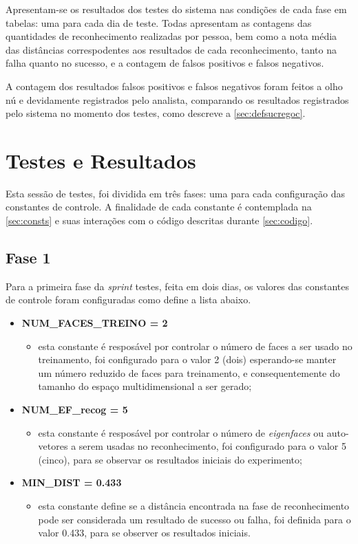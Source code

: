 Apresentam-se os resultados dos testes do sistema nas condições de cada fase em tabelas: uma para cada dia de teste. Todas apresentam as contagens das quantidades de reconhecimento realizadas por pessoa, bem como a nota média das distâncias correspodentes aos resultados de cada reconhecimento, tanto na falha quanto no sucesso, e a contagem de falsos positivos e falsos negativos.

A contagem dos resultados falsos positivos e falsos negativos foram feitos a olho nú e devidamente registrados pelo analista, comparando os resultados registrados pelo sistema no momento dos testes, como descreve a \autoref{sec:defsucregoc}.

\section{Testes e Resultados}\label{ch:testresult}

Esta sessão de testes, foi dividida em três fases: uma para cada configuração das constantes de controle. A finalidade de cada constante é contemplada na \autoref{sec:consts} e suas interações com o código descritas durante \autoref{sec:codigo}.


\subsection{Fase 1}\label{ch:testresultfaz1}
Para a primeira fase da \textit{sprint} testes, feita em dois dias, os valores das constantes de controle foram configuradas como define a lista abaixo.

\begin{itemize}	
	\item \textbf{NUM\_FACES\_TREINO = 2}
	\begin{itemize}	
		\item esta constante é resposável por controlar o número de faces a ser usado no treinamento, foi configurado para o valor 2 (dois) esperando-se manter um número reduzido de faces para treinamento, e consequentemente do tamanho do espaço multidimensional a ser gerado;
	\end{itemize}

	\item \textbf{NUM\_EF\_recog = 5}
	\begin{itemize}	
		\item esta constante é resposável por controlar o número de \textit{eigenfaces} ou auto-vetores a serem usadas no reconhecimento, foi configurado para o valor 5 (cinco), para se observar os resultados iniciais do experimento;
	\end{itemize}

	\item \textbf{MIN\_DIST = 0.433}
	\begin{itemize}	
		\item esta constante define se a distância encontrada na fase de reconhecimento pode ser considerada um resultado de sucesso ou falha, foi definida para o valor 0.433, para se observer os resultados iniciais.
	\end{itemize}
\end{itemize}

